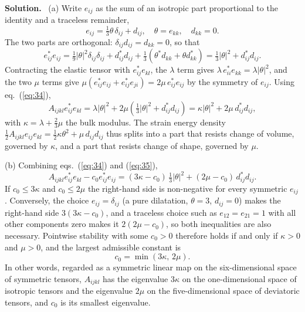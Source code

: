 \documentclass[a4paper,12pt]{paper}
\newenvironment{solution}{\par\noindent\textbf{Solution.}\ }{\par\medskip}
\begin{document}
\begin{solution}
(a) Write $e_{ij}$ as the sum of an isotropic part proportional to the identity and a traceless remainder,
\begin{equation}
e_{ij}=\tfrac{1}{3}\theta\,\delta_{ij}+d_{ij},\quad \theta=e_{kk},\quad d_{kk}=0.
\label{eq:33}
\end{equation}
The two parts are orthogonal: $\delta_{ij}d_{ij}=d_{kk}=0$, so that
\begin{equation}
e_{ij}^{*}e_{ij}=\tfrac{1}{9}|\theta|^{2}\delta_{ij}\delta_{ij}+d_{ij}^{*}d_{ij}
+\tfrac{1}{3}\left(\theta^{*}d_{kk}+\theta d_{kk}^{*}\right)=\tfrac{1}{3}|\theta|^{2}+d_{ij}^{*}d_{ij}.
\label{eq:34}
\end{equation}
Contracting the elastic tensor with $e_{ij}^{*}e_{kl}$, the $\lambda$ term gives
$\lambda\,e_{ii}^{*}e_{kk}=\lambda|\theta|^{2}$, and the two $\mu$ terms give
$\mu(e_{ij}^{*}e_{ij}+e_{ij}^{*}e_{ji})=2\mu\,e_{ij}^{*}e_{ij}$ by the symmetry of $e_{ij}$. Using
eq.~(\ref{eq:34}),
\begin{equation}
A_{ijkl}e_{ij}^{*}e_{kl}=\lambda|\theta|^{2}+2\mu\left(\tfrac{1}{3}|\theta|^{2}+d_{ij}^{*}d_{ij}\right)
=\kappa|\theta|^{2}+2\mu\,d_{ij}^{*}d_{ij},
\label{eq:35}
\end{equation}
with $\kappa=\lambda+\frac{2}{3}\mu$ the bulk modulus. The strain energy density
$\frac{1}{2}A_{ijkl}e_{ij}e_{kl}=\frac{1}{2}\kappa\theta^{2}+\mu\,d_{ij}d_{ij}$ thus splits into a part
that resists change of volume, governed by $\kappa$, and a part that resists change of shape, governed
by $\mu$.

(b) Combining eqs.~(\ref{eq:34}) and (\ref{eq:35}),
\begin{equation}
A_{ijkl}e_{ij}^{*}e_{kl}-c_{0}e_{ij}^{*}e_{ij}=(3\kappa-c_{0})\,\tfrac{1}{3}|\theta|^{2}+(2\mu-c_{0})\,d_{ij}^{*}d_{ij}.
\label{eq:36}
\end{equation}
If $c_{0}\le 3\kappa$ and $c_{0}\le 2\mu$ the right-hand side is non-negative for every symmetric
$e_{ij}$. Conversely, the choice $e_{ij}=\delta_{ij}$ (a pure dilatation, $\theta=3$, $d_{ij}=0$) makes the
right-hand side $3(3\kappa-c_{0})$, and a traceless choice such as $e_{12}=e_{21}=1$ with all other
components zero makes it $2(2\mu-c_{0})$, so both inequalities are also necessary. Pointwise stability
with some $c_{0}>0$ therefore holds if and only if $\kappa>0$ and $\mu>0$, and the largest admissible
constant is
\begin{equation}
c_{0}=\min(3\kappa,\,2\mu).
\label{eq:37}
\end{equation}
In other words, regarded as a symmetric linear map on the six-dimensional space of symmetric tensors,
$A_{ijkl}$ has the eigenvalue $3\kappa$ on the one-dimensional space of isotropic tensors and the
eigenvalue $2\mu$ on the five-dimensional space of deviatoric tensors, and $c_{0}$ is its smallest
eigenvalue.


\end{solution}
\end{document}

